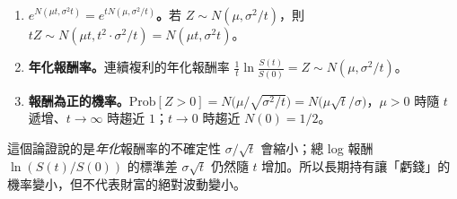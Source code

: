 \begin{remark}
	\begin{enumerate}[(1),nosep]
		\item \textbf{$e^{N(\mu t,\sigma^{2}t)}=e^{tN(\mu,\sigma^{2}/t)}$。}若 $Z\sim N(\mu,\sigma^{2}/t)$，則 $tZ\sim N(\mu t,t^{2}\cdot\sigma^{2}/t)=N(\mu t,\sigma^{2}t)$。
		\item \textbf{年化報酬率。}連續複利的年化報酬率 $\frac1t\ln\frac{S(t)}{S(0)}=Z\sim N(\mu,\sigma^{2}/t)$。
		\item \textbf{報酬為正的機率。}$\mathrm{Prob}[Z>0]=N\bigl(\mu/\sqrt{\sigma^{2}/t}\bigr)=N\bigl(\mu\sqrt{t}/\sigma\bigr)$，$\mu>0$ 時隨 $t$ 遞增、$t\to\infty$ 時趨近 $1$；$t\to0$ 時趨近 $N(0)=1/2$。
	\end{enumerate}
\end{remark}

\begin{note}
	這個論證說的是\emph{年化}報酬率的不確定性 $\sigma/\sqrt{t}$ 會縮小；總 log 報酬 $\ln(S(t)/S(0))$ 的標準差 $\sigma\sqrt{t}$ 仍然隨 $t$ 增加。所以長期持有讓「虧錢」的機率變小，但不代表財富的絕對波動變小。
\end{note}
\suppend
